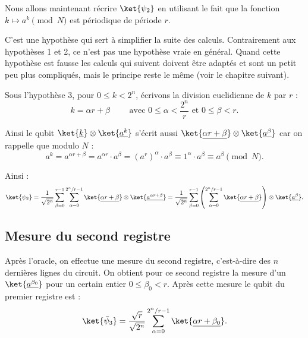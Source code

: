 \documentclass[11pt,class=report,crop=false]{standalone}
\begin{document}
\bigskip

Nous allons maintenant récrire $\ket{\psi_2}$ en utilisant le fait que la fonction
$k \mapsto a^k\pmod N$ est périodique de période $r$.

\bigskip


\bigskip

C'est une hypothèse qui sert à simplifier la suite des calculs. Contrairement aux hypothèses 1 et 2, ce n'est pas une hypothèse vraie en général. Quand cette hypothèse est fausse les calculs qui suivent doivent être adaptés et sont un petit peu plus compliqués, mais le principe reste le même (voir le chapitre suivant).
  

Sous l'hypothèse 3, pour $0 \le k < 2^n$, écrivons la division euclidienne de
$k$ par $r$ :  
$$k = \alpha r + \beta \qquad 
\text{ avec } 0 \le \alpha < \frac{2^n}{r} 
\text{ et } 0 \le \beta < r.$$

Ainsi le qubit $\ket{\underline{k}} \otimes \ket{\underline {a^k}}$
s'écrit aussi
$\ket{\underline{\alpha r + \beta}} \otimes \ket{\underline {a^\beta}}$
car on rappelle que modulo $N$ : 
$$a^k = a^{\alpha r + \beta} = a^{\alpha r} \cdot a^\beta
= (a^r)^\alpha \cdot a^\beta \equiv 1^\alpha \cdot a^\beta \equiv a^\beta \pmod N.$$

Ainsi :
 $$\ket{\psi_2} 
= \frac{1}{\sqrt{2^n}} \sum_{\beta=0}^{r-1} \sum_{\alpha=0}^{2^n/r-1} \ket{\underline{\alpha r + \beta}} \otimes \ket{\underline {a^{\alpha r + \beta}}}
= \frac{1}{\sqrt{2^n}} \sum_{\beta=0}^{r-1} \left(\sum_{\alpha=0}^{2^n/r-1} \ket{\underline{\alpha r + \beta}} \right) \otimes \ket{\underline {a^\beta}}.
$$


\subsection{Mesure du second registre}

Après l'oracle, on effectue une mesure du second registre, c'est-à-dire des $n$ dernières lignes du circuit.
On obtient pour ce second registre la mesure d'un $\ket{ \underline{a^{\beta_0}} }$ pour un certain entier $0 \le \beta_0 < r$.
Après cette mesure le qubit du premier registre est :
$$\ket{\bar \psi_3} = \frac{\sqrt{r}}{\sqrt{2^n}} \sum_{\alpha=0}^{2^n/r-1} \ket{\underline{\alpha r + \beta_0}}.$$
\end{document}
